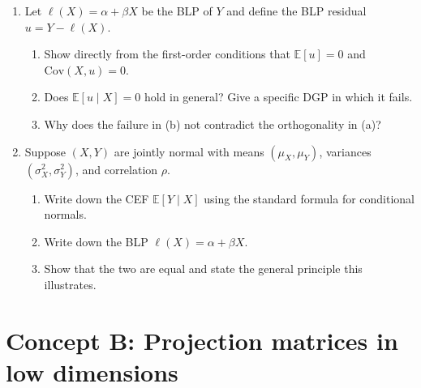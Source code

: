 \documentclass{article}
\newcommand{\E}{\mathbb{E}}
\begin{document}
\begin{enumerate}[label=\textbf{A.\arabic*},leftmargin=*,itemsep=10pt]
\item Let $\ell(X) = \alpha + \beta X$ be the BLP of $Y$ and define the BLP residual $u = Y - \ell(X)$.
\begin{enumerate}[label=(\alph*)]
  \item Show directly from the first-order conditions that $\E[u] = 0$ and $\text{Cov}(X, u) = 0$.
  \item Does $\E[u \mid X] = 0$ hold in general?  Give a specific DGP in which it fails.
  \item Why does the failure in (b) not contradict the orthogonality in (a)?
\end{enumerate}

\item Suppose $(X, Y)$ are jointly normal with means $(\mu_X, \mu_Y)$, variances $(\sigma_X^2, \sigma_Y^2)$, and correlation $\rho$.
\begin{enumerate}[label=(\alph*)]
  \item Write down the CEF $\E[Y \mid X]$ using the standard formula for conditional normals.
  \item Write down the BLP $\ell(X) = \alpha + \beta X$.
  \item Show that the two are equal and state the general principle this illustrates.
\end{enumerate}

\end{enumerate}

\bigskip

\section*{Concept B: Projection matrices in low dimensions}
\end{document}

